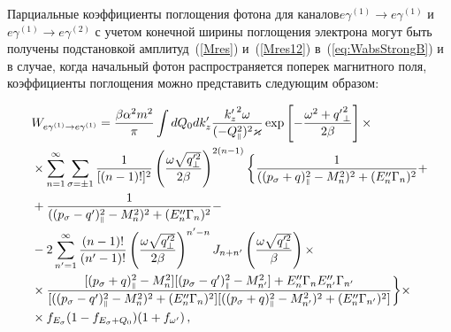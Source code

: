  Парциальные коэффициенты поглощения фотона для каналов\linebreak $e \gamma^{(1)} \to e\gamma^{(1)}$ и $e \gamma^{(1)} \to e\gamma^{(2)}$ с учетом конечной ширины поглощения электрона могут быть получены подстановкой амплитуд~(\ref{Mres}) и~(\ref{Mres12}) в~(\ref{eq:WabsStrongB}) и в случае, когда начальный фотон распространяется поперек магнитного поля, коэффициенты поглощения можно представить следующим образом:


\begin{equation}\nonumber
	\begin{aligned}\label{Wres}
		&W_{e\gamma^{(1)}\to e\gamma^{(1)}}=\frac{\beta\alpha^2m^2}{\pi} \int dQ_0dk'_z \frac{{k_z'}^2\omega } {(-Q_{\mbox{\tiny $\|$}}^2)^2\varkappa}\exp\left[-\frac{\omega^2+{q'}_\perp^2}{2\beta}\right]\times\\ 
		&\times\sum_{n=1}^{\infty}\sum_{\sigma=\pm 1}\frac{1}{[(n-1)!]^2}\left(\frac{\omega \sqrt{q_\perp'^2}}{2\beta}\right)^{2(n-1)}\bigg\{
		\frac{1}{((p_\sigma+q)_{\mbox{\tiny $\|$}}^2-M_n^2)^2+(E''_n\Gamma_n)^2}  +\\
		&+\frac{1}{((p_\sigma-q')_{\mbox{\tiny $\|$}}^2-M_n^2)^2+(E''_n\Gamma_n)^2}-
		\\
		&-2
		\sum_{n'=1}^{\infty}\frac{(n-1)!}{(n'-1)!}\left(\frac{\omega \sqrt{q_\perp'^2}}{2\beta}\right)^{n'-n}J_{n+n'}\left(\frac{\omega \sqrt{q_\perp'^2}}{\beta}\right)\times\\
		&\times\frac{[(p_\sigma+q)^2_{\mbox{\tiny $\|$}}-M_n^2][(p_\sigma-q')^2_{\mbox{\tiny $\|$}}-M^2_{n'}]+E''_n\Gamma_nE''_{n'}\Gamma_{n'}}{[((p_\sigma-q')_{\mbox{\tiny $\|$}}^2-M_n^2)^2+(E''_n\Gamma_n)^2][((p_\sigma+q)_{\mbox{\tiny $\|$}}^2-M_{n'}^2)^2+(E''_n\Gamma_{n'})^2]}
		\bigg\}\times
		\\&\times f_{E_\sigma}(1-f_{E_\sigma+Q_0})(1+f_{\omega'}
		) \, ,
	\end{aligned}
\end{equation}

